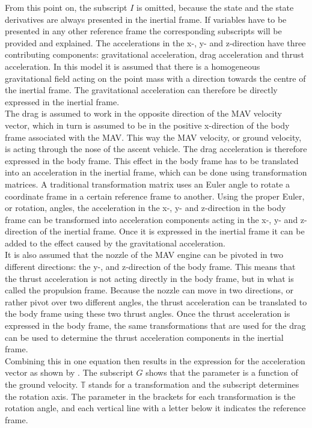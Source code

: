 \noindent
From this point on, the subscript $I$ is omitted, because the state and the state derivatives are always presented in the inertial frame. If variables have to be presented in any other reference frame the corresponding subscripts will be provided and explained. The accelerations in the x-, y- and z-direction have three contributing components: gravitational acceleration, drag acceleration and thrust acceleration. In this model it is assumed that there is a homogeneous gravitational field acting on the point mass with a direction towards the centre of the inertial frame. The gravitational acceleration can therefore be directly expressed in the inertial frame. \\
The drag is assumed to work in the opposite direction of the \ac{MAV} velocity vector, which in turn is assumed to be in the positive x-direction of the body frame associated with the \ac{MAV}. This way the \ac{MAV} velocity, or ground velocity, is acting through the nose of the ascent vehicle. The drag acceleration is therefore expressed in the body frame. This effect in the body frame has to be translated into an acceleration in the inertial frame, which can be done using transformation matrices. A traditional transformation matrix uses an Euler angle to rotate a coordinate frame in a certain reference frame to another. Using the proper Euler, or rotation, angles, the acceleration in the x-, y- and z-direction in the body frame can be transformed into acceleration components acting in the x-, y- and z-direction of the inertial frame. Once it is expressed in the inertial frame it can be added to the effect caused by the gravitational acceleration. \\
It is also assumed that the nozzle of the \ac{MAV} engine can be pivoted in two different directions: the y-, and z-direction of the body frame. This means that the thrust acceleration is not acting directly in the body frame, but in what is called the propulsion frame. Because the nozzle can move in two directions, or rather pivot over two different angles, the thrust acceleration can be translated to the body frame using these two thrust angles. Once the thrust acceleration is expressed in the body frame, the same transformations that are used for the drag can be used to determine the thrust acceleration components in the inertial frame. \\

\noindent
Combining this in one equation then results in the expression for the acceleration vector as shown by . The subscript $G$ shows that the parameter is a function of the ground velocity. $\mathbb{T}$ stands for a transformation and the subscript determines the rotation axis. The parameter in the brackets for each transformation is the rotation angle, and each vertical line with a letter below it indicates the reference frame. 

